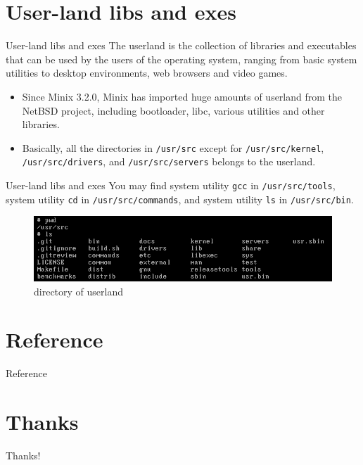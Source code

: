 \documentclass[12pt]{beamer}
\begin{document}
\section{User-land libs and exes}
\begin{frame}{User-land libs and exes}
    The userland is the collection of libraries and executables that can be used by the users of the operating system, ranging from basic system utilities to desktop environments, web browsers and video games\cite{minixuserland}. 
    \begin{itemize}
        \item Since Minix 3.2.0, Minix has imported huge amounts of userland from the NetBSD project, including bootloader, libc, various utilities and other libraries\cite{minix3wikipedia}.
        \item Basically, all the directories in \texttt{/usr/src} except for \texttt{/usr/src/kernel}, \texttt{/usr/src/drivers}, and \texttt{/usr/src/servers} belongs to the userland.
    \end{itemize}
\end{frame}

\begin{frame}{User-land libs and exes}
    You may find system utility \texttt{gcc} in \texttt{/usr/src/tools}, system utility \texttt{cd} in \texttt{/usr/src/commands}, and system utility \texttt{ls} in \texttt{/usr/src/bin}.
    \begin{figure}[H]
        \centering
        \includegraphics[width=0.9\linewidth]{userland.png}
        \caption{directory of userland}
        \label{fig:userland_png}
    \end{figure}
\end{frame}
\section{Reference}
\begin{frame}[allowframebreaks]{Reference}
    \printbibliography
\end{frame}
\section{Thanks}
\begin{frame}
\begin{center}
    \Huge Thanks!
\end{center}
\end{frame}
\end{document}
